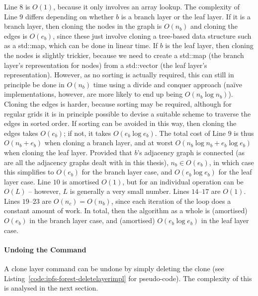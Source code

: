 Line $8$ is $O(1)$, because it only involves an array lookup. The complexity of Line $9$ differs depending on whether $b$ is a branch layer or the leaf layer. If it is a branch layer, then cloning the nodes in the graph is $O(n_b)$ and cloning the edges is $O(e_b)$, since these just involve cloning a tree-based data structure such as a std::map, which can be done in linear time. If $b$ is the leaf layer, then cloning the nodes is slightly trickier, because we need to create a std::map (the branch layer's representation for nodes) from a std::vector (the leaf layer's representation). However, as no sorting is actually required, this can still in principle be done in $O(n_b)$ time using a divide and conquer approach (na\"ive implementations, however, are more likely to end up being $O(n_b \log n_b)$). Cloning the edges is harder, because sorting may be required, although for regular grids it is in principle possible to devise a suitable scheme to traverse the edges in sorted order. If sorting can be avoided in this way, then cloning the edges takes $O(e_b)$; if not, it takes $O(e_b \log e_b)$. The total cost of Line $9$ is thus $O(n_b + e_b)$ when cloning a branch layer, and at worst $O(n_b \log n_b + e_b \log e_b)$ when cloning the leaf layer. Provided that $b$'s adjacency graph is connected (as are all the adjacency graphs dealt with in this thesis), $n_b \in O(e_b)$, in which case this simplifies to $O(e_b)$ for the branch layer case, and $O(e_b \log e_b)$ for the leaf layer case. Line $10$ is amortised $O(1)$, but for an individual operation can be $O(L)$ -- however, $L$ is generally a very small number. Lines $14$--$17$ are $O(1)$. Lines $19$--$23$ are $O(n_c) = O(n_b)$, since each iteration of the loop does a constant amount of work. In total, then the algorithm as a whole is (amortised) $O(e_b)$ in the branch layer case, and (amortised) $O(e_b \log e_b)$ in the leaf layer case.

\paragraph{Undoing the Command}

A clone layer command can be undone by simply deleting the clone (see Listing~\ref{code:ipfs-forest-deletelayerimpl} for pseudo-code). The complexity of this is analysed in the next section.


\afterpage{\clearpage}
\newpage

